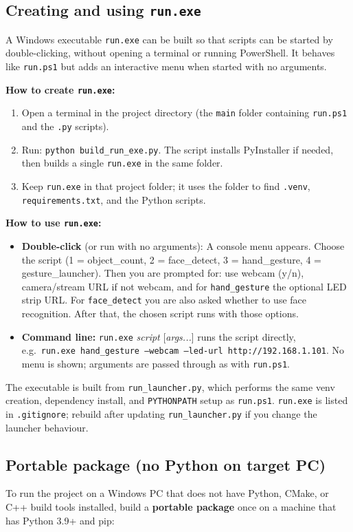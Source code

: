 \documentclass[a4paper,12pt]{article}
\begin{document}
\subsection{Creating and using \texttt{run.exe}}
A Windows executable \texttt{run.exe} can be built so that scripts can be started by double-clicking, without opening a terminal or running PowerShell. It behaves like \texttt{run.ps1} but adds an interactive menu when started with no arguments.

\textbf{How to create \texttt{run.exe}:}
\begin{enumerate}
    \item Open a terminal in the project directory (the \texttt{main} folder containing \texttt{run.ps1} and the \texttt{.py} scripts).
    \item Run: \texttt{python build\_run\_exe.py}. The script installs PyInstaller if needed, then builds a single \texttt{run.exe} in the same folder.
    \item Keep \texttt{run.exe} in that project folder; it uses the folder to find \texttt{.venv}, \texttt{requirements.txt}, and the Python scripts.
\end{enumerate}

\textbf{How to use \texttt{run.exe}:}
\begin{itemize}
    \item \textbf{Double-click} (or run with no arguments): A console menu appears. Choose the script (1 = object\_count, 2 = face\_detect, 3 = hand\_gesture, 4 = gesture\_launcher). Then you are prompted for: use webcam (y/n), camera/stream URL if not webcam, and for \texttt{hand\_gesture} the optional LED strip URL. For \texttt{face\_detect} you are also asked whether to use face recognition. After that, the chosen script runs with those options.
    \item \textbf{Command line:} \texttt{run.exe} \textit{script} [\textit{args...}] runs the script directly, e.g.\ \texttt{run.exe hand\_gesture --webcam --led-url http://192.168.1.101}. No menu is shown; arguments are passed through as with \texttt{run.ps1}.
\end{itemize}

The executable is built from \texttt{run\_launcher.py}, which performs the same venv creation, dependency install, and \texttt{PYTHONPATH} setup as \texttt{run.ps1}. \texttt{run.exe} is listed in \texttt{.gitignore}; rebuild after updating \texttt{run\_launcher.py} if you change the launcher behaviour.

\subsection{Portable package (no Python on target PC)}
To run the project on a Windows PC that does not have Python, CMake, or C++ build tools installed, build a \textbf{portable package} once on a machine that has Python 3.9+ and pip:
\end{document}
